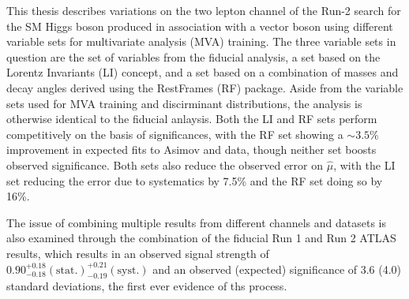 




This thesis describes variations on the two lepton channel of the Run-2 search for the SM Higgs boson produced in association with a vector boson using different variable sets for multivariate analysis (MVA) training.  
The three variable sets in question are the set of variables from the fiducial analysis, a set based on the Lorentz Invariants (LI) concept, and a set based on a combination of masses and decay angles derived using the RestFrames (RF) package.
Aside from the variable sets used for MVA training and discirminant distributions, the analysis is otherwise identical to the fiducial anlaysis. %
Both the LI and RF sets perform competitively on the basis of significances, with the RF set showing a $\sim3.5$\% improvement in expected fits to Asimov and data, though neither set boosts observed significance.
Both sets also reduce the observed error on $\hat{\mu}$, with the LI set reducing the error due to systematics by 7.5\% and the RF set doing so by 16\%.

The issue of combining multiple results from different channels and datasets is also examined through the combination of the fiducial Run 1 and Run 2 ATLAS \vhbb\,results, which results in an observed signal strength of $0.90^{+0.18}_{-0.18}(\textrm{stat.})^{+0.21}_{-0.19}(\textrm{syst.})$ and an observed (expected) significance of 3.6 (4.0) standard deviations, the first ever evidence of ths process. 
